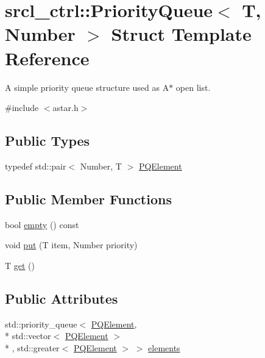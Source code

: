 \hypertarget{structsrcl__ctrl_1_1PriorityQueue}{\section{srcl\-\_\-ctrl\-:\-:Priority\-Queue$<$ T, Number $>$ Struct Template Reference}
\label{structsrcl__ctrl_1_1PriorityQueue}
}


A simple priority queue structure used as A$\ast$ open list.  




{\ttfamily \#include $<$astar.\-h$>$}

\subsection*{Public Types}
\begin{DoxyCompactItemize}
\item 
typedef std\-::pair$<$ Number, T $>$ \hyperlink{structsrcl__ctrl_1_1PriorityQueue_a13adb99a78e01b3fbf453e6bc5b8ce39}{P\-Q\-Element}
\end{DoxyCompactItemize}
\subsection*{Public Member Functions}
\begin{DoxyCompactItemize}
\item 
bool \hyperlink{structsrcl__ctrl_1_1PriorityQueue_ad36dcefb2ba7a31f1cd9c78353ac87e3}{empty} () const 
\item 
void \hyperlink{structsrcl__ctrl_1_1PriorityQueue_ac96327c955fa10e88699c8325817c892}{put} (T item, Number priority)
\item 
T \hyperlink{structsrcl__ctrl_1_1PriorityQueue_a51ebef251641f5f51768b7ec4ab94a51}{get} ()
\end{DoxyCompactItemize}
\subsection*{Public Attributes}
\begin{DoxyCompactItemize}
\item 
std\-::priority\-\_\-queue$<$ \hyperlink{structsrcl__ctrl_1_1PriorityQueue_a13adb99a78e01b3fbf453e6bc5b8ce39}{P\-Q\-Element}, \\*
std\-::vector$<$ \hyperlink{structsrcl__ctrl_1_1PriorityQueue_a13adb99a78e01b3fbf453e6bc5b8ce39}{P\-Q\-Element} $>$\\*
, std\-::greater$<$ \hyperlink{structsrcl__ctrl_1_1PriorityQueue_a13adb99a78e01b3fbf453e6bc5b8ce39}{P\-Q\-Element} $>$ $>$ \hyperlink{structsrcl__ctrl_1_1PriorityQueue_afd9907537d5a1df02f71e6e0a7806b8f}{elements}
\end{DoxyCompactItemize}


